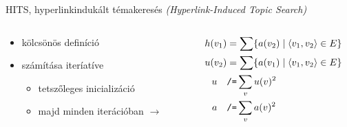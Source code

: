 \documentclass{beamer}
\newlength{\onecolwid}
\newlength{\twocolwid}
\begin{document}
\begin{frame}[t]
\begin{columns}[t]
\begin{column}{\twocolwid}
        \begin{block}{HITS, hyperlinkindukált témakeresés
          \emph{(Hyperlink-Induced Topic Search)}}
          \begin{columns}
            \begin{column}{\onecolwid}
              \begin{columns}
                \begin{column}{.5\columnwidth}
                  \begin{itemize}
                    \item kölcsönös definíció
                    \item számítása iteríatíve 
                      \begin{itemize}
                        \item tetszőleges inicializáció
                        \item  majd minden iterációban $\rightarrow$
                      \end{itemize} \end{itemize} 
                  \end{column}
                  \begin{column}{.5\columnwidth}
                    \begin{align*}
                      h(v_1) &= \sum \{ a(v_2)\mid \langle v_1,v_2\rangle \in E \} \\
                        u(v_2) &= \sum \{ a(v_1)\mid \langle v_1,v_2\rangle \in E \} \\
                        u\quad &{\text{\texttt{/=}}} \sum_v u(v)^2 \\
                        a\quad &{\text{\texttt{/=}}} \sum_v a(v)^2
                    \end{align*}
                  \end{column}
                \end{columns}
              \end{column}


\end{columns}
\end{block}
\end{column}
\end{columns}
\end{frame}
\end{document}

